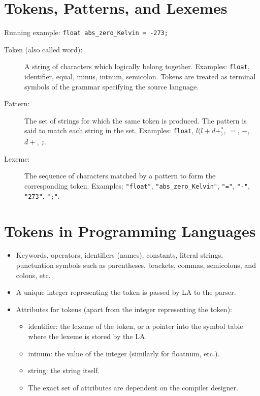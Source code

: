 \documentclass[12pt,a4paper]{article}
\begin{document}
\section{Tokens, Patterns, and Lexemes}
Running example: \texttt{float abs\_zero\_Kelvin = -273;}
\begin{description}
    \item[Token (also called word):] A string of characters which logically belong together. Examples: \texttt{float}, identifier, equal, minus, intnum, semicolon. Tokens are treated as terminal symbols of the grammar specifying the source language.
    \item[Pattern:] The set of strings for which the same token is produced. The pattern is said to match each string in the set. Examples: \texttt{float}, $l(l+d+_)^*$, $=$, $-$, $d+$, \texttt{;}.
    \item[Lexeme:] The sequence of characters matched by a pattern to form the corresponding token. Examples: \texttt{"float"}, \texttt{"abs\_zero\_Kelvin"}, \texttt{"="}, \texttt{"-"}, \texttt{"273"}, \texttt{";"}.
\end{description}

\section{Tokens in Programming Languages}
\begin{itemize}
    \item Keywords, operators, identifiers (names), constants, literal strings, punctuation symbols such as parentheses, brackets, commas, semicolons, and colons, etc.
    \item A unique integer representing the token is passed by LA to the parser.
    \item Attributes for tokens (apart from the integer representing the token):
    \begin{itemize}
        \item identifier: the lexeme of the token, or a pointer into the symbol table where the lexeme is stored by the LA.
        \item intnum: the value of the integer (similarly for floatnum, etc.).
        \item string: the string itself.
        \item The exact set of attributes are dependent on the compiler designer.
    \end{itemize}
\end{itemize}
\end{document}
